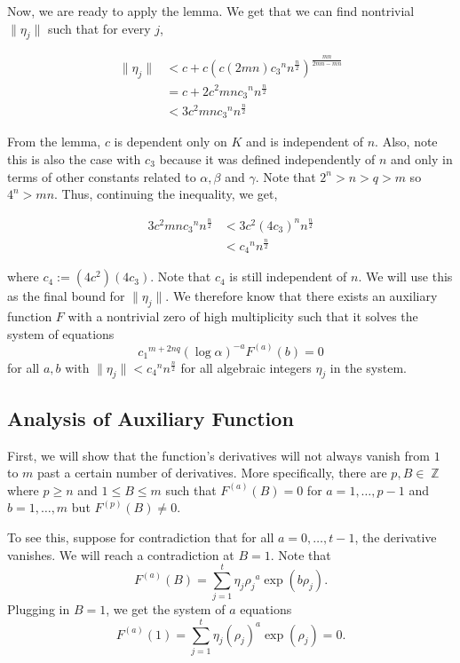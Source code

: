 \documentclass[a4paper, 11pt]{book}
\DeclareMathOperator{\Z}{\mathbb{Z}}
\begin{document}
{Now, we are ready to apply the lemma. We get that we can find nontrivial $\| \eta_j \|$ such that for every $j$, 

\begin{align*}
    \| \eta_j \| &< c + c{\left(c\left(2mn\right){c_3}^{n}n^{\frac{n}{2}}\right)}^{\frac{mn}{2mn - mn}} \\
                 &= c + 2c^{2}mn{c_{3}}^{n}n^{\frac{n}{2}} \\
                 &< 3{c}^{2}mn{c_{3}}^{n}{n}^{\frac{n}{2}} 
\end{align*}
}

From the lemma, $c$ is dependent only on $K$ and is independent of $n$. Also, note this is also the case with $c_3$ because it was defined independently of $n$ and only in terms of other constants related to $\alpha, \beta$ and $\gamma$. Note that $2^{n} > n > q > m$ so $4^{n} > mn$. Thus, continuing the inequality, we get,

\begin{align*}
    3{c}^{2}mn{c_{3}}^{n}{n}^{\frac{n}{2}} &< 3{c}^{2}{(4c_3)}^{n}n^{\frac{n}{2}} \\ 
                                           &< {c_4}^{n}n^{\frac{n}{2}}
\end{align*}

where $c_4 := \left(4{c}^{2}\right)\left(4c_3\right)$. Note  that $c_4$ is still independent of $n$. We will use this as the final bound for $\| \eta_j \|$. We therefore know that there exists an auxiliary function $F$ with a nontrivial zero of high multiplicity such that it solves the system of equations 
\[{c_1}^{m + 2nq} {(\log \alpha)}^{-a}F^{(a)}(b) = 0\]
for all $a,b$ with $\| \eta_j \| < {c_4}^{n}n^{\frac{n}{2}}$ for all algebraic integers $\eta_j$ in the system.

\subsection{Analysis of Auxiliary Function}
First, we will show that the function's derivatives will not always vanish from $1$ to $m$ past a certain number of derivatives. More specifically, there are $p, B \in \Z$ where $p \geq n$ and $1 \leq B \leq m$ such that $F^{(a)}(B) = 0$ for $a = 1, \ldots, p-1$ and $b = 1, \ldots, m$ but $F^{(p)}(B) \neq 0$.\par

To see this, suppose for contradiction that for all $a = 0, \ldots, t-1$, the derivative vanishes. We will reach a contradiction at $B = 1$. Note that \[F^{(a)}(B) = \sum\limits_{j=1}^{t} \eta_{j}{\rho_{j}}^{a}\exp(b\rho_j).\] Plugging in $B = 1$, we get the system of $a$ equations \[F^{(a)}(1) = \sum\limits_{j = 1}^{t} \eta_{j}{\left(\rho_j\right)}^{a}\exp(\rho_j) = 0.\]
\end{document}
